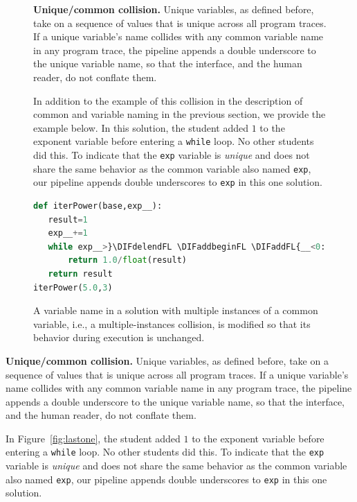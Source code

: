 \documentclass[12pt,twoside]{mitthesis}
\newcommand \codevar[1]{\texttt{#1}}
\providecommand{\DIFaddtex}[1]{{\protect\color{blue}\uwave{#1}}} %
\providecommand{\DIFaddFL}[1]{\DIFadd{#1}} %
\providecommand{\DIFaddbeginFL}{} %
\providecommand{\DIFdelendFL}{} %
\providecommand{\DIFadd}[1]{\texorpdfstring{\DIFaddtex{#1}}{#1}} %
\begin{document}
\begin{figure}
{\bf Unique/common collision.} Unique variables, as defined before, take on a sequence of values that is unique across all program traces. If a unique variable's name collides with any common variable name in any program trace, the pipeline appends a double underscore to the unique variable name, so that the interface, and the human reader, do not conflate them. 

In addition to the example of this collision in the description of common and variable naming in the previous section, we provide the example below. In this solution, the student added $1$ to the exponent variable before entering a \codevar{while} loop. No other students did this. To indicate that the \codevar{exp} variable is {\it unique} and does not share the same behavior as the common variable also named \codevar{exp}, our pipeline appends double underscores to \codevar{exp} in this one solution. 

\begin{minipage}{0.45\linewidth}
\begin{lstlisting}[language=python,linebackgroundcolor={\lstcolorlines[lightyellow]{1,3,4,6}}]
def iterPower(base,exp__):
   result=1
   exp__+=1
   while exp__>}\DIFdelendFL \DIFaddbeginFL \DIFaddFL{__<0:
       return 1.0/float(result)
   return result
iterPower(5.0,3)
\end{lstlisting}
\end{minipage}
\caption{A variable name in a solution with multiple instances of a common variable, i.e., a multiple-instances collision, is modified so that its behavior during execution is unchanged.}
\label{fig:multiinst}
\end{figure}

{\bf Unique/common collision.} Unique variables, as defined before, take on a sequence of values that is unique across all program traces. If a unique variable's name collides with any common variable name in any program trace, the pipeline appends a double underscore to the unique variable name, so that the interface, and the human reader, do not conflate them. 

In Figure~\ref{fig:lastone}, the student added $1$ to the exponent variable before entering a \codevar{while} loop. No other students did this. To indicate that the \codevar{exp} variable is {\it unique} and does not share the same behavior as the common variable also named \codevar{exp}, our pipeline appends double underscores to \codevar{exp} in this one solution. 
\end{document}
